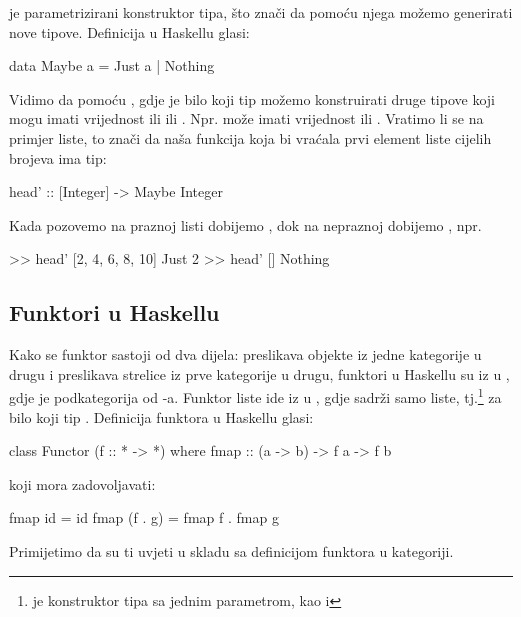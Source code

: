    je parametrizirani konstruktor tipa, što znači da pomoću njega možemo generirati nove tipove. Definicija  u
  Haskellu glasi:
  \begin{mcode}
    data Maybe a = Just a | Nothing
  \end{mcode}
  Vidimo da pomoću , gdje je  bilo koji tip možemo
  konstruirati druge tipove koji mogu imati vrijednost ili  ili
  . Npr.  može imati vrijednost  ili . Vratimo li se na primjer liste, to znači da naša funkcija
  koja bi vraćala prvi element liste cijelih brojeva ima tip:
  \begin{mcode}
    head' :: [Integer] -> Maybe Integer
  \end{mcode}
  Kada pozovemo  na praznoj listi dobijemo , dok na
  nepraznoj dobijemo , npr.
  \begin{mcode}
    >> head' [2, 4, 6, 8, 10]
    Just 2
    >> head' []
    Nothing
  \end{mcode}
  
  \subsection{Funktori u Haskellu}
  Kako se funktor sastoji od dva dijela: preslikava objekte iz jedne kategorije u drugu
  i preslikava strelice iz prve kategorije u drugu, funktori u Haskellu su iz
   u , gdje je  podkategorija od
  -a. Funktor liste ide iz  u ,
  gdje  sadrži samo liste, tj.\codei{[T]}\footnote{
    \codei{[a]} je konstruktor tipa sa jednim parametrom,
    kao i }
  za bilo koji tip . Definicija funktora u Haskellu glasi:
  \begin{mcode}
    class Functor (f :: * -> *) where
      fmap :: (a -> b) -> f a -> f b
  \end{mcode}
  koji mora zadovoljavati:
  \begin{mcode}
    fmap id = id
    fmap (f . g) = fmap f . fmap g
  \end{mcode}
  Primijetimo da su ti uvjeti u skladu sa definicijom funktora u kategoriji.\\
  
